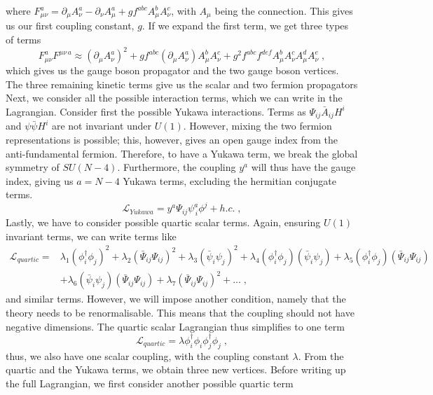 where $F_{\mu\nu}^a=\partial_\mu A_\nu^a-\partial_\nu A_\mu ^a+g f^{abc}A_\mu^bA_\nu^c$, with $A_\mu$ being the connection. This gives us our first coupling constant, $g$. If we expand the first term, we get three types of terms
\begin{equation}
    F_{\mu\nu}^a F^{\mu\nu\,a}\approx(\partial_\mu A_\nu^a)^2+ g f^{abc}(\partial_\mu A_\nu^a)A_\mu^bA_\nu^c +g^2 f^{abc}f^{def}A_\mu^bA_\nu^cA_\mu^dA_\nu^e\;,
\end{equation}
which gives us the gauge boson propagator and the two gauge boson vertices. The three remaining kinetic terms give us the scalar and two fermion propagators 
Next, we consider all the possible interaction terms, which we can write in the Lagrangian. Consider first the possible Yukawa interactions. Terms as $\Psi_{ij}\bar A_{ij}H^i$ and $\psi \bar \psi H^i$ are not invariant under $U(1)$. However, mixing the two fermion representations is possible; this, however, gives an open gauge index from the anti-fundamental fermion. Therefore, to have a Yukawa term, we break the global symmetry of $SU(N-4)$. Furthermore, the coupling $y^a$ will thus have the gauge index, giving us $a=N-4$ Yukawa terms, excluding the hermitian conjugate terms.
\begin{equation}
    \mathcal{L}_{Yukawa}= y^a\Psi_{ij} \psi ^a_{\, i} \phi^j + h.c.\; ,
\end{equation}
Lastly, we have to consider possible quartic scalar terms. Again, ensuring $U(1)$ invariant terms, we can write terms like
\begin{align}
    \mathcal{L}_{quartic}= &
    \lambda_1 (\phi^\dagger_i \phi_j)^2 
    + \lambda_2 (\bar \Psi_{ij}\Psi_{ij})^2
    +\lambda_3 (\bar \psi_{i}\psi_{j})^2
    +\lambda_4 (\phi^\dagger_i \phi_j)(\bar \psi_{i}\psi_{j})
    +\lambda_5 (\phi^\dagger_i \phi_j)(\bar \Psi_{ij}\Psi_{ij})
    \\&+\lambda_6 (\bar \psi_{i}\psi_{j})(\bar \Psi_{ij}\Psi_{ij})
    +\lambda_7 (\bar \Psi_{ij}\Psi_{ij})^2+...\;,
\end{align}
and similar terms. However, we will impose another condition, namely that the theory needs to be renormalisable. This means that the coupling should not have negative dimensions. The quartic scalar Lagrangian thus simplifies to one term
\begin{equation}
    \mathcal{L}_{quartic}= 
    \lambda \phi^\dagger_i \phi_i \phi^\dagger_j \phi_j \;,
\end{equation}
thus, we also have one scalar coupling, with the coupling constant $\lambda$. From the quartic and the Yukawa terms, we obtain three new vertices. Before writing up the full Lagrangian, we first consider another possible quartic term 
